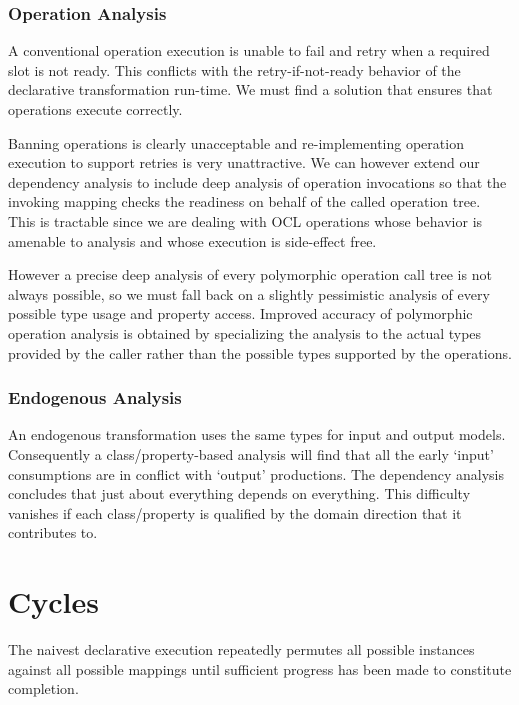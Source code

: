 \documentclass{jot}
\begin{document}
\subsubsection{Operation Analysis}

A conventional operation execution is unable to fail and retry when a required slot is not ready. This conflicts with the retry-if-not-ready behavior of the declarative transformation run-time. We must find a solution that ensures that operations execute correctly. 

Banning operations is clearly unacceptable and re-implementing operation execution to support retries is very unattractive. We can however extend our dependency analysis to include deep analysis of operation invocations so that the invoking mapping checks the readiness on behalf of the called operation tree. This is tractable since we are dealing with OCL operations whose behavior is amenable to analysis and whose execution is side-effect free.

However a precise deep analysis of every polymorphic operation call tree is not always possible, so we must fall back on a slightly pessimistic analysis of every possible type usage and property access. Improved accuracy of polymorphic operation analysis is obtained by specializing the analysis to the actual types provided by the caller rather than the possible types supported by the operations.

\subsubsection{Endogenous Analysis}

An endogenous transformation uses the same types for input and output models. Consequently a class/property-based analysis will find that all the early `input' consumptions are in conflict with `output' productions. The dependency analysis concludes that just about everything depends on everything. This difficulty vanishes if each class/property is qualified by the domain direction that it contributes to.

\section{Cycles}\label{Cycles}

The naivest declarative execution repeatedly permutes all possible instances against all possible mappings until sufficient progress has been made to constitute completion.
\end{document}
